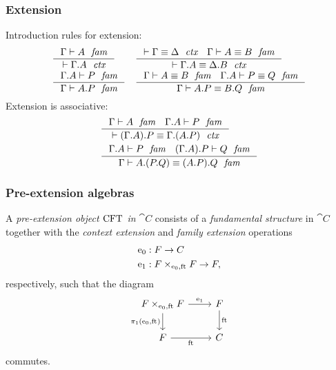\documentclass[handout]{beamer}
\begin{document}
\begin{frame}
\frametitle{Extension}
Introduction rules for extension:
\begin{align*}
& \inference
  { \jfam{\Gamma}{A}
    }
  { \jctx{\ctxext{\Gamma}{A}}
    }
& & \inference
    { \jctxeq{\Gamma}{\Delta}
      \jfameq{\Gamma}{A}{B}
      }
    { \jctxeq{\ctxext{\Gamma}{A}}{\ctxext{\Delta}{B}}
      }
    \\
& \inference
  { \jfam{{\Gamma}{A}}{P}
    }
  { \jfam{\Gamma}{\ctxext{A}{P}}
    }
& & \inference
    { \jfameq{\Gamma}{A}{B} 
      \jfameq{{\Gamma}{A}}{P}{Q}
      }
    { \jfameq{\Gamma}{\ctxext{A}{P}}{\ctxext{B}{Q}}
      }
\end{align*}
\pause
Extension is associative:
\begin{align*}
& \inference
  { \jfam{\Gamma}{A}
    \jfam{{\Gamma}{A}}{P}
    }
  { \jctxeq{\ctxext{{\Gamma}{A}}{P}}{\ctxext{\Gamma}{{A}{P}}}
    }
  \\
& \inference
  { \jfam{{\Gamma}{A}}{P}
    \jfam{{{\Gamma}{A}}{P}}{Q}
    }
  { \jfameq{\Gamma}{\ctxext{A}{{P}{Q}}}{\ctxext{{A}{P}}{Q}}
    }
\end{align*}
\end{frame}


\begin{frame}
\frametitle{Pre-extension algebras}
A \emph{pre-extension object $\mathrm{CFT}$ in $\cat{C}$} consists of a \emph{fundamental structure}
in $\cat{C}$ together with the \emph{context extension} and \emph{family extension} operations
\begin{align*}
\ectxext%
  &%
: \stesysf \to \stesysc%
  \\
\efamext%
  &%
: \stesysff \to \stesysf,%
\end{align*}
respectively, such that the diagram
\begin{equation*}
\begin{tikzcd}[ampersand replacement=\&]
\stesysff 
  \ar{r}{\efamext} 
  \ar{d}[swap]{\pullbackpr{1}{\ectxext}{\eft}} 
  \& 
\stesysf 
  \ar{d}{\eft}
  \\
\stesysf
  \ar{r}[swap]{\eft} 
  \& 
\stesysc
\end{tikzcd}
\end{equation*}
commutes.
\end{frame}
\end{document}
